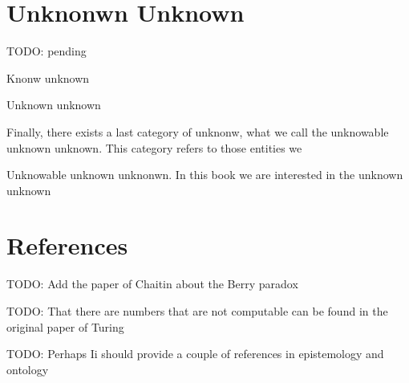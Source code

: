 %
%

\section{Unknonwn Unknown}

{\color{red} TODO: pending}

Knonw unknown

Unknown unknown

Finally, there exists a last category of unknonw, what we call the unknowable unknown unknown. This category refers to those entities we

Unknowable unknown unknonwn. In this book we are interested in the unknown unknown

%
%

\section*{References}

{\color{red} TODO: Add the paper of Chaitin about the Berry paradox}

{\color{red} TODO: That there are numbers that are not computable can be found in the original paper of Turing}

{\color{red} TODO: Perhaps Ii should provide a couple of references in epistemology and ontology}
